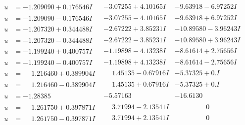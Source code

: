 \documentclass[1p]{elsarticle_modified}
\theoremstyle{definition}
\begin{document}
$$\begin{array}{c|c|c}
\begin{aligned}
u &= -1.209090 + 0.176546 I\end{aligned}
 & -3.07255 + 4.10165 I & -9.63918 - 6.97252 I \\ \hline\begin{aligned}
u &= -1.209090 - 0.176546 I\end{aligned}
 & -3.07255 - 4.10165 I & -9.63918 + 6.97252 I \\ \hline\begin{aligned}
u &= -1.207320 + 0.344488 I\end{aligned}
 & -2.67222 + 3.85231 I & -10.89580 - 3.96243 I \\ \hline\begin{aligned}
u &= -1.207320 - 0.344488 I\end{aligned}
 & -2.67222 - 3.85231 I & -10.89580 + 3.96243 I \\ \hline\begin{aligned}
u &= -1.199240 + 0.400757 I\end{aligned}
 & -1.19898 - 4.13238 I & -8.61614 + 2.75656 I \\ \hline\begin{aligned}
u &= -1.199240 - 0.400757 I\end{aligned}
 & -1.19898 + 4.13238 I & -8.61614 - 2.75656 I \\ \hline\begin{aligned}
u &= \phantom{-}1.216460 + 0.389904 I\end{aligned}
 & \phantom{-}1.45135 - 0.67916 I & -5.37325 + 0. I\phantom{ +0.000000I} \\ \hline\begin{aligned}
u &= \phantom{-}1.216460 - 0.389904 I\end{aligned}
 & \phantom{-}1.45135 + 0.67916 I & -5.37325 + 0. I\phantom{ +0.000000I} \\ \hline\begin{aligned}
u &= -1.28385\phantom{ +0.000000I}\end{aligned}
 & -5.57163\phantom{ +0.000000I} & -16.6130\phantom{ +0.000000I} \\ \hline\begin{aligned}
u &= \phantom{-}1.261750 + 0.397871 I\end{aligned}
 & \phantom{-}3.71994 - 2.13541 I & \phantom{-0.000000 } 0 \\ \hline\begin{aligned}
u &= \phantom{-}1.261750 - 0.397871 I\end{aligned}
 & \phantom{-}3.71994 + 2.13541 I & \phantom{-0.000000 } 0 \\ \hline\begin{aligned}

\end{aligned}
\end{array}$$
\end{document}
